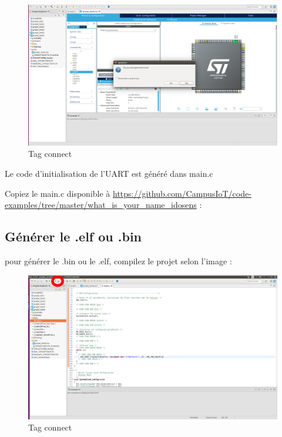 \documentclass{article}
\begin{document}
\begin{figure}[H]
\begin{center}
\advance\leftskip-3cm
\advance\rightskip-3cm
\includegraphics[keepaspectratio=true,scale=0.3]{do_you_wanttogeneratecode.png}
\caption{Tag connect}
\label{visina8}
\end{center}\end{figure}

Le code d'initialisation de l'UART est généré dans main.c

Copiez le main.c disponible à \url{https://github.com/CampusIoT/code-examples/tree/master/what_is_your_name_idosens} :


\subsection{Générer le .elf ou .bin}

pour générer le .bin ou le .elf, compilez le projet selon l'image :

\begin{figure}[H]
\begin{center}
\advance\leftskip-3cm
\advance\rightskip-3cm
\includegraphics[keepaspectratio=true,scale=0.3]{build_all.png}
\caption{Tag connect}
\label{visina8}
\end{center}\end{figure}
\end{document}
